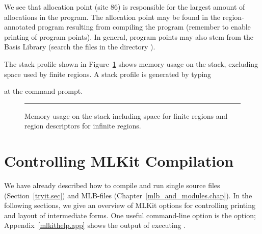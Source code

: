 \documentclass[12pt]{book}
\begin{document}
We see that allocation point  (site 86) is responsible for the largest amount of
allocations in the program. The allocation point may be found in the
region-annotated program resulting from compiling the  program
(remember to enable printing of program points). In general, program points may
also stem from the Basis Library (search the  files in the directory
).

The stack profile shown in Figure~\ref{prof_eks3.fig} shows memory usage on the
stack, excluding space used by finite regions. A
%
%
%
%
stack profile is generated by typing
at the command prompt.

\begin{figure}
\caption{Memory usage on the stack including space for finite regions and region
  descriptors for infinite regions.}
\label{prof_eks3.fig}
\medskip\hrule
\end{figure}


\chapter{Controlling MLKit Compilation}
\label{controlkit.sec}
\label{startup.sec}

We have already described how to compile and run single source files
(Section~\ref{tryit.sec}) and MLB-files (Chapter~\ref{mlb_and_modules.chap}).
In the following sections, we give an overview of MLKit options for controlling
printing and layout of intermediate forms. One useful command-line option is the
%
%
%
 option; Appendix~\ref{mlkithelp.app} shows the output of executing
.


\end{document}
